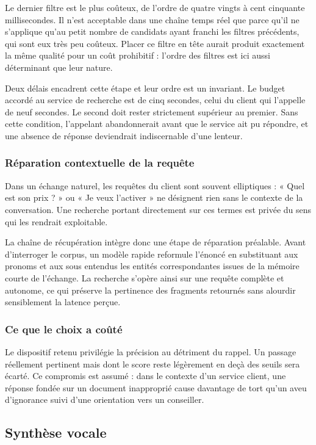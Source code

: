 Le dernier filtre est le plus coûteux, de l'ordre de quatre vingts à cent cinquante millisecondes. Il n'est acceptable dans une chaîne temps réel que parce qu'il ne s'applique qu'au petit nombre de candidats ayant franchi les filtres précédents, qui sont eux très peu coûteux. Placer ce filtre en tête aurait produit exactement la même qualité pour un coût prohibitif : l'ordre des filtres est ici aussi déterminant que leur nature.

Deux délais encadrent cette étape et leur ordre est un invariant. Le budget accordé au service de recherche est de cinq secondes, celui du client qui l'appelle de neuf secondes. Le second doit rester strictement supérieur au premier. Sans cette condition, l'appelant abandonnerait avant que le service ait pu répondre, et une absence de réponse deviendrait indiscernable d'une lenteur.

\subsubsection{Réparation contextuelle de la requête}

Dans un échange naturel, les requêtes du client sont souvent elliptiques : « Quel est son prix ? » ou « Je veux l'activer » ne désignent rien sans le contexte de la conversation. Une recherche portant directement sur ces termes est privée du sens qui les rendrait exploitable.

La chaîne de récupération intègre donc une étape de réparation préalable. Avant d'interroger le corpus, un modèle rapide reformule l'énoncé en substituant aux pronoms et aux sous entendus les entités correspondantes issues de la mémoire courte de l'échange. La recherche s'opère ainsi sur une requête complète et autonome, ce qui préserve la pertinence des fragments retournés sans alourdir sensiblement la latence perçue.

\subsubsection{Ce que le choix a coûté}

Le dispositif retenu privilégie la précision au détriment du rappel. Un passage réellement pertinent mais dont le score reste légèrement en deçà des seuils sera écarté. Ce compromis est assumé : dans le contexte d'un service client, une réponse fondée sur un document inapproprié cause davantage de tort qu'un aveu d'ignorance suivi d'une orientation vers un conseiller.

\subsection{Synthèse vocale}

